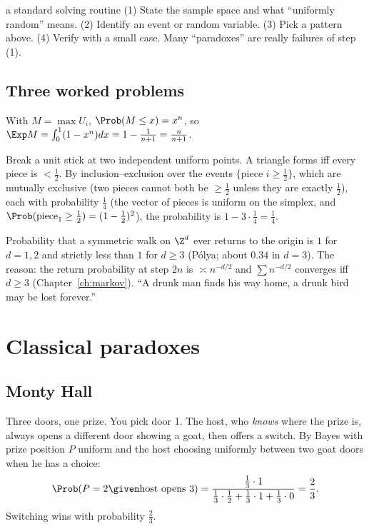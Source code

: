 \begin{interview}{a standard solving routine}
(1) State the sample space and what ``uniformly random'' means. (2) Identify an event or random variable.
(3) Pick a pattern above. (4) Verify with a small case. Many ``paradoxes'' are really failures of step (1).
\end{interview}

\subsection*{Three worked problems}

\begin{example}
With $M=\max U_i$, $\Prob(M\le x)=x^n$, so $\Exp M=\int_0^1(1-x^n)dx=1-\frac1{n+1}=\frac n{n+1}$.
\end{example}

\begin{example}
Break a unit stick at two independent uniform points. A triangle forms iff every piece is $<\tfrac12$.
By inclusion--exclusion over the events $\{$piece $i\ge\tfrac12\}$, which are mutually exclusive (two
pieces cannot both be $\ge\tfrac12$ unless they are exactly $\tfrac12$), each with probability $\tfrac14$
(the vector of pieces is uniform on the simplex, and $\Prob(\text{piece}_1\ge\tfrac12)=(1-\tfrac12)^2$), the
probability is $1-3\cdot\tfrac14=\tfrac14$.
\end{example}

\begin{example}
Probability that a symmetric walk on $\Z^d$ ever returns to the origin is $1$ for $d=1,2$ and
strictly less than $1$ for $d\ge3$ (P\'olya; about $0.34$ in $d=3$). The reason: the return probability at step
$2n$ is $\asymp n^{-d/2}$ and $\sum n^{-d/2}$ converges iff $d\ge3$ (Chapter~\ref{ch:markov}). ``A drunk man
finds his way home, a drunk bird may be lost forever.''
\end{example}

\section{Classical paradoxes}

\subsection{Monty Hall}

Three doors, one prize. You pick door 1. The host, who \emph{knows} where the prize is, always opens a
different door showing a goat, then offers a switch. By Bayes with prize position $P$ uniform and the host
choosing uniformly between two goat doors when he has a choice:
\[
\Prob(P=2\given\text{host opens }3)=\frac{\tfrac13\cdot1}{\tfrac13\cdot\tfrac12+\tfrac13\cdot1+\tfrac13\cdot0}=\frac23 .
\]
Switching wins with probability $\tfrac23$.

